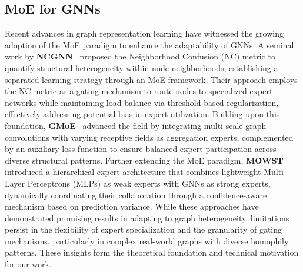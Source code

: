 \subsection{MoE for GNNs}
Recent advances in graph representation learning have witnessed the growing adoption of the MoE paradigm to enhance the adaptability of GNNs. A seminal work by \textbf{NCGNN}~\cite{NCGNN} proposed the Neighborhood Confusion (NC) metric to quantify structural heterogeneity within node neighborhoods, establishing a separated learning strategy through an MoE framework. Their approach employs the NC metric as a gating mechanism to route nodes to specialized expert networks while maintaining load balance via threshold-based regularization, effectively addressing potential bias in expert utilization. Building upon this foundation, \textbf{GMoE}~\cite{GMoE} advanced the field by integrating multi-scale graph convolutions with varying receptive fields as aggregation experts, complemented by an auxiliary loss function to ensure balanced expert participation across diverse structural patterns. Further extending the MoE paradigm, \textbf{MOWST}~\cite{mowst} introduced a hierarchical expert architecture that combines lightweight Multi-Layer Perceptrons (MLPs) as weak experts with GNNs as strong experts, dynamically coordinating their collaboration through a confidence-aware mechanism based on prediction variance. While these approaches have demonstrated promising results in adapting to graph heterogeneity, limitations persist in the flexibility of expert specialization and the granularity of gating mechanisms, particularly in complex real-world graphs with diverse homophily patterns. These insights form the theoretical foundation and technical motivation for our work.
